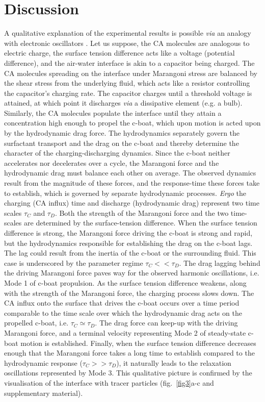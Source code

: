 \documentclass[journal=langd5, manuscript=article, layout=twocolumn]{achemso}
\begin{document}
\section{Discussion}
\label{discusssec}
A qualitative explanation of the experimental results is possible {\it via} an analogy with electronic oscillators \cite{Diefenderfer1994, Strogatz2001}. Let us suppose, the CA molecules are analogous to electric charge, the surface tension difference acts like a voltage (potential difference), and the air-water interface is akin to a capacitor being charged. The CA molecules spreading on the interface under Marangoni stress are balanced by the shear stress from the underlying fluid, which acts like a resistor controlling the capacitor's charging rate. The capacitor charges until a threshold voltage is attained, at which point it discharges {\it via} a dissipative element (e.g. a bulb). Similarly, the CA molecules populate the interface until they attain a concentration high enough to propel the c-boat, which upon motion is acted upon by the hydrodynamic drag force. The hydrodynamics separately govern the surfactant transport and the drag on the c-boat and thereby determine the character of the charging-discharging dynamics. Since the c-boat neither accelerates nor decelerates over a cycle, the Marangoni force and the hydrodynamic drag must balance each other on average. The observed dynamics result from the magnitude of these forces, and the response-time these forces take to establish, which is governed by separate hydrodynamic processes. {\it Ergo} the charging (CA influx) time and discharge (hydrodynamic drag) represent two time scales $\tau_C$ and $\tau_D$. Both the strength of the Marangoni force and the two time-scales are determined by the surface-tension difference. When the surface tension difference is strong, the Marangoni force driving the c-boat is strong and rapid, but the hydrodynamics responsible for establishing the drag on the c-boat lags. The lag could result from the inertia of the c-boat or the surrounding fluid. This case is underscored by the parameter regime $\tau_C << \tau_D$. The drag lagging behind the driving Marangoni force paves way for the observed harmonic oscillations, i.e. Mode 1 of c-boat propulsion.  As the surface tension difference weakens, along with the strength of the Marangoni force, the charging process slows down. The CA influx onto the surface that drives the c-boat occurs over a time period comparable to the time scale over which the hydrodynamic drag acts on the propelled c-boat, i.e. $\tau_C \simeq \tau_D$. The drag force can keep-up with the driving Marangoni force, and a terminal velocity representing Mode 2 of steady-state c-boat motion is established. Finally, when the surface tension difference decreases enough that the Marangoni force takes a long time to establish compared to the hydrodynamic response ($\tau_C >> \tau_D$),  it naturally leads to the relaxation oscillations represented by Mode 3. This qualitative picture is confirmed by the visualisation of the interface with tracer particles (fig.~\ref{fig3}a-c and supplementary material).
\end{document}
